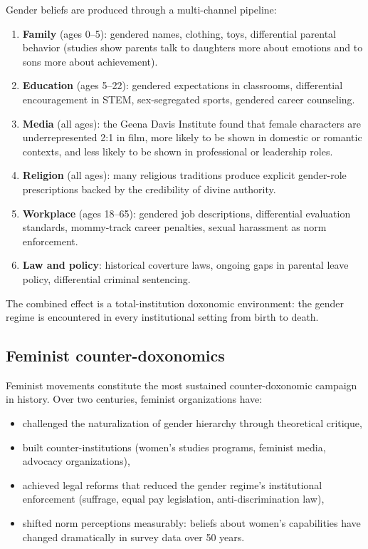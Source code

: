 \begin{model}
\label{mod:gender-production}
Gender beliefs are produced through a multi-channel pipeline:
\begin{enumerate}[nosep]
  \item \textbf{Family} (ages 0--5): gendered names, clothing, toys, differential parental behavior (studies show parents talk to daughters more about emotions and to sons more about achievement).
  \item \textbf{Education} (ages 5--22): gendered expectations in classrooms, differential encouragement in STEM, sex-segregated sports, gendered career counseling.
  \item \textbf{Media} (all ages): the Geena Davis Institute found that female characters are underrepresented 2:1 in film, more likely to be shown in domestic or romantic contexts, and less likely to be shown in professional or leadership roles.
  \item \textbf{Religion} (all ages): many religious traditions produce explicit gender-role prescriptions backed by the credibility of divine authority.
  \item \textbf{Workplace} (ages 18--65): gendered job descriptions, differential evaluation standards, mommy-track career penalties, sexual harassment as norm enforcement.
  \item \textbf{Law and policy}: historical coverture laws, ongoing gaps in parental leave policy, differential criminal sentencing.
\end{enumerate}
The combined effect is a total-institution doxonomic environment: the gender regime is encountered in every institutional setting from birth to death.
\end{model}

\subsection{Feminist counter-doxonomics}

Feminist movements constitute the most sustained counter-doxonomic campaign in history.
Over two centuries, feminist organizations have:
\begin{itemize}[nosep]
  \item challenged the naturalization of gender hierarchy through theoretical critique,
  \item built counter-institutions (women's studies programs, feminist media, advocacy organizations),
  \item achieved legal reforms that reduced the gender regime's institutional enforcement (suffrage, equal pay legislation, anti-discrimination law),
  \item shifted norm perceptions measurably: beliefs about women's capabilities have changed dramatically in survey data over 50 years.
\end{itemize}

